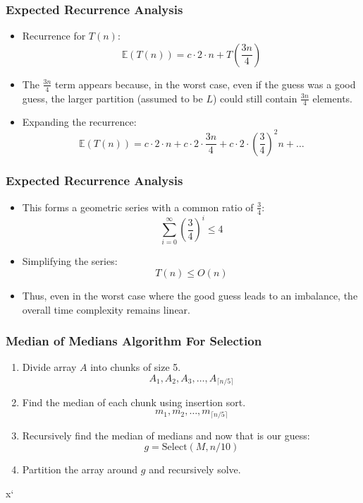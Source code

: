 \begin{frame}
    \frametitle{Expected Recurrence Analysis}
    \begin{itemize}
        \item Recurrence for \(T(n)\):
        \[
        \mathbb{E}(T(n)) = c \cdot 2 \cdot n + T\left(\frac{3n}{4}\right)
        \]
        \item The \( \frac{3n}{4} \) term appears because, in the worst case, even if the guess was a good guess, the larger partition (assumed to be \(L\)) could still contain \(\frac{3n}{4}\) elements.
        \vspace{0.4cm}
        \item Expanding the recurrence:
        \[
        \mathbb{E}(T(n)) = c \cdot 2 \cdot n + c \cdot 2 \cdot \frac{3n}{4} + c \cdot 2 \cdot \left(\frac{3}{4}\right)^2 n + \dots
        \]
            \end{itemize}
\end{frame}
\begin{frame}
    \frametitle{Expected Recurrence Analysis}
    \begin{itemize}
        \item This forms a geometric series with a common ratio of \(\frac{3}{4}\):
        \[
        \sum_{i=0}^{\infty} \left(\frac{3}{4}\right)^i \leq 4
        \]
        \item Simplifying the series:
        \[
        T(n) \leq O(n)
        \]
        \vspace{0.2cm}
        \item Thus, even in the worst case where the good guess leads to an imbalance, the overall time complexity remains linear.
    \end{itemize}
\end{frame}

\begin{frame}
    \frametitle{Median of Medians Algorithm For Selection}
    \begin{enumerate}
        \item Divide array \(A\) into chunks of size 5.
        \[
        A_1, A_2, A_3, \dots, A_{\lceil n/5 \rceil}
        \]
        \item Find the median of each chunk using insertion sort.
        \[
        m_1, m_2, \dots, m_{\lceil n/5 \rceil}
        \]
        \item Recursively find the median of medians and now that is our guess:
        \[
        g = \text{Select}(M, n/10)
        \]
        
        \item Partition the array around \(g\) and recursively solve.
    \end{enumerate}
x`\end{frame}

